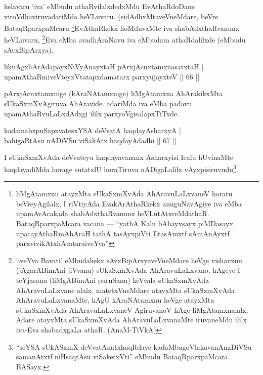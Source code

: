 \begin{artha}
kelavaru `iva' eMbudu athaRvilalxdedxMdu EvAthaRdoDane viroVdhaviruvadariMda heVLuvaru. (sidAdhxMtaveVneMdare, beVre BataqRparxpaMcaru \footnote{liMgAtamxnu atayxMta sUkaSxmXvAda AhAravuLaLxvaneV horatu beVreyAgilalx, I riVtiyAda EvakArAthaRkekx anuguNavAgiye iva eMba upamAvAcakada shabAdxthaRvanunx heVLutAtxreMdathaR. BataqRparxpaMcara vacana --- ``yathA Kalu bAhayxsayx piMDasayx upacayAthaRmAhAraH tathA tasAyxpiVti EtasAmxtf sAmAnAyxtf parxvivikAtxhArataraiveYva''}EvAthaRkekx hoMduvaMte iva shabAdxthaRvanunx heVLuvaru, \footnote{`iveYva Bavati' eMbudakekx sAvxBipArxyaveVneMdare heVge vishavxnu (jAgarABimAni jiVvanu) sUkaSxmXvAda AhAravuLaLxvano, hAgeye I teYjasanu (liMgABimAni puruSanu) keVvala sUkaSxmXvAda AhAravuLaLxvane alalx. matetxVneMdare atayxMta sUkaSxmXvAda AhAravuLaLxvanaMte, hAgU kAraNAtamxnu heVge atayxMta sUkaSxmXvAda AhAravuLaLxvaneV AgiruvanoV hAge liMgAtamxnalalx, Adare atayxMta sUkaSxmXvAda AhAravuLaLxvanaMte iruvaneMdu ililx iva-Eva shabadxgaLa athaR. (AnaM-TiVkA)}Eva eMba avadhAraNavu iva eMbudara athaRdalilxde (eMbudu sAvxBipArxya).
\end{artha}


\begin{shl}
liknAgxhArAdapayxNiVyAnayxtaH pArxjAcnxtamxnasatxtaH |\\
upamAthaRmiveVteyxVtatapxdamatarx parxyujayxteV \hfill || 66 || 
\end{shl}

\begin{artha}
pArxjAcnxtamxnige (kAraNAtamxnige) liMgAtamxna AhArakikxMta sUkaSxmXvAgiruva AhAravide. adariMda iva eMba padavu upamAthaRvuLaLxdAdxgi ililx parxyoVgisalapxTiTxde.
\end{artha}


\begin{shl}
kadamabxpuSapxvatesxYSA deVvatA haqdayAsharxyA |\\
bahigaRtAsu nADiVSu viSakAtx haqdayAdadhi \hfill || 67 || 
\end{shl}

\begin{artha}
I sUkaSxmXvAda deVvateyu haqdayavanunx Asharxyisi Icalu hUvinaMte haqdayadiMda horage sutatxlU horaTiruva nADigaLalilx vAyxpisiruvudu\footnote{``seYSA sUkASxmX deVvatA\s natxhaqRdaye kadaMbagoVlakavanAnxDiVSu samanAtxtf niHsaqtAsu viSaketxVti'' eMbudu BataqRparxpaMcara BASayx.}.
\end{artha}

